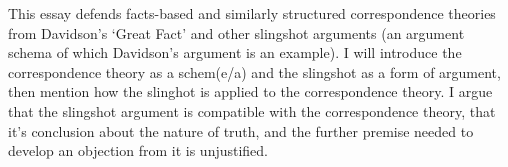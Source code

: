 This essay defends facts-based and similarly structured correspondence theories from Davidson's `Great Fact' and other slingshot arguments (an argument schema of which Davidson's argument is an example).
I will introduce the correspondence theory as a schem(e/a) and the slingshot as a form of argument, then mention how the slinghot is applied to the correspondence theory.
I argue that the slingshot argument is compatible with the correspondence theory, that it's conclusion about the nature of truth, and the further premise needed to develop an objection from it is unjustified.
